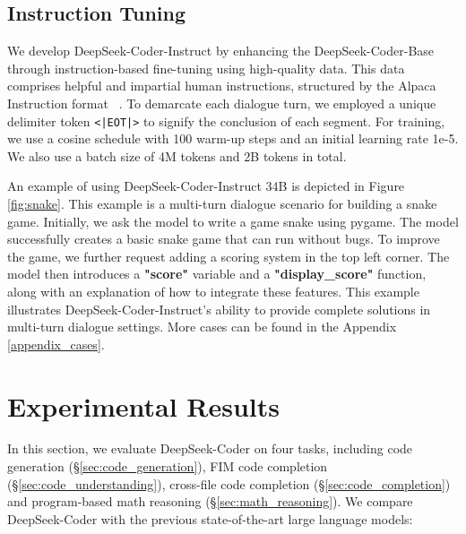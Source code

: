 \subsection{Instruction Tuning} We develop DeepSeek-Coder-Instruct by enhancing the DeepSeek-Coder-Base through instruction-based fine-tuning using high-quality data. This data comprises helpful and impartial human instructions, structured by the Alpaca Instruction format ~\citep{alpaca}. To demarcate each dialogue turn, we employed a unique delimiter token \texttt{<|EOT|>} to signify the conclusion of each segment. For training, we use a cosine schedule with 100 warm-up steps and an initial learning rate 1e-5. We also use a batch size of 4M tokens and 2B tokens in total. 

An example of using DeepSeek-Coder-Instruct 34B is depicted in Figure \ref{fig:snake}. This example is a multi-turn dialogue scenario for building a snake game. Initially, we ask the model to write a game snake using pygame. The model successfully creates a basic snake game that can run without bugs. To improve the game, we further request adding a scoring system in the top left corner. The model then introduces a \textbf{"score"} variable and a \textbf{"display\_score"} function, along with an explanation of how to integrate these features. This example illustrates DeepSeek-Coder-Instruct's ability to provide complete solutions in multi-turn dialogue settings. More cases can be found in the Appendix \ref{appendix_cases}.

\section{Experimental Results} In this section, we evaluate DeepSeek-Coder on four tasks, including code generation (\S \ref{sec:code_generation}),
FIM code completion (\S \ref{sec:code_understanding}), cross-file code completion (\S \ref{sec:code_completion}) and program-based math reasoning (\S \ref{sec:math_reasoning}). We compare DeepSeek-Coder with the previous state-of-the-art large language models:

